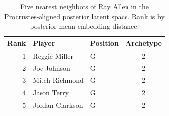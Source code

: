 \begin{table}[htbp]
  \centering\small
  \begin{tabular}{rllc}
    \toprule
    Rank & Player & Position & Archetype \\
    \midrule
    1 & Reggie Miller & G & 2 \\
    2 & Joe Johnson & G & 2 \\
    3 & Mitch Richmond & G & 2 \\
    4 & Jason Terry & G & 2 \\
    5 & Jordan Clarkson & G & 2 \\
    \bottomrule
  \end{tabular}
  \caption{Five nearest neighbors of Ray Allen in the Procrustes-aligned posterior latent space. Rank is by posterior mean embedding distance.}
  \label{tab:Ray_Allen_neighbors}
\end{table}

